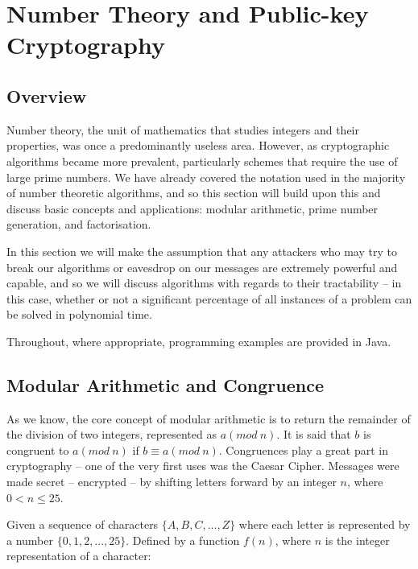 
\chapter{Number Theory and Public-key Cryptography}
\label{Chapter3}

\section{Overview}

Number theory, the unit of mathematics that studies integers and their properties, was once a predominantly useless area. However, as cryptographic algorithms became more prevalent, particularly schemes that require the use of large prime numbers. We have already covered the notation used in the majority of number theoretic algorithms, and so this section will build upon this and discuss basic concepts and applications: modular arithmetic, prime number generation, and factorisation.

In this section we will make the assumption that any attackers who may try to break our algorithms or eavesdrop on our messages are extremely powerful and capable, and so we will discuss algorithms with regards to their tractability -- in this case, whether or not a significant percentage of all instances of a problem can be solved in polynomial time.

Throughout, where appropriate, programming examples are provided in Java.

\section{Modular Arithmetic and Congruence}

  As we know, the core concept of modular arithmetic is to return the remainder of the division of two integers, represented as $a(mod \ n)$. It is said that $b$ is congruent to $a(mod \ n)$ if $b \equiv a(mod \ n)$. Congruences play a great part in cryptography -- one of the very first uses was the Caesar Cipher. Messages were made secret -- encrypted -- by shifting letters forward by an integer $n$, where $0 < n \leq 25$.
  
  Given a sequence of characters $\{A,B,C,...,Z\}$ where each letter is represented by a number $\{0,1,2,...,25\}$. Defined by a function $f(n)$, where $n$ is the integer representation of a character:
  

